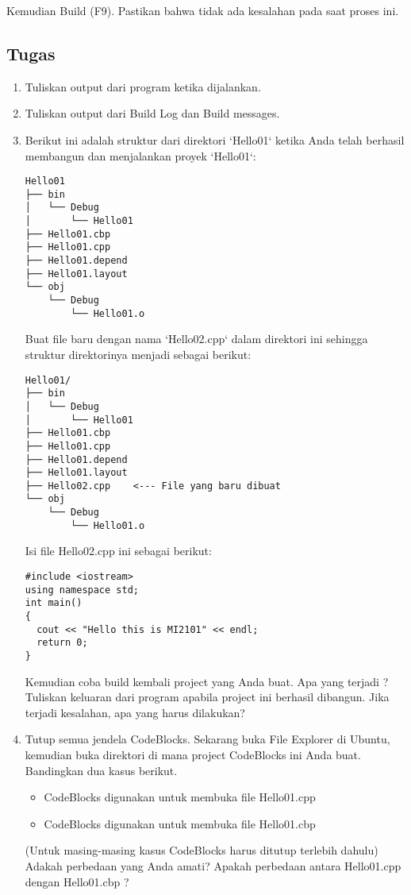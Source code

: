 \documentclass[a4paper,11pt]{extarticle}
\begin{document}
Kemudian \textsf{Build (F9)}. Pastikan bahwa tidak ada kesalahan pada saat proses ini.

\subsection{Tugas}

\begin{enumerate}
\item Tuliskan output dari program ketika dijalankan.
%
\item Tuliskan output dari \textsf{Build Log} dan \textsf{Build messages}.
%
\item Berikut ini adalah struktur dari direktori `Hello01` ketika Anda
      telah berhasil membangun dan menjalankan proyek `Hello01`:
%
\begin{verbatim}
Hello01
├── bin
│   └── Debug
│       └── Hello01
├── Hello01.cbp
├── Hello01.cpp
├── Hello01.depend
├── Hello01.layout
└── obj
    └── Debug
        └── Hello01.o
\end{verbatim}
   Buat file baru dengan nama `Hello02.cpp` dalam direktori ini sehingga
   struktur direktorinya menjadi sebagai berikut:
%
\begin{verbatim}
Hello01/
├── bin
│   └── Debug
│       └── Hello01
├── Hello01.cbp
├── Hello01.cpp
├── Hello01.depend
├── Hello01.layout
├── Hello02.cpp    <--- File yang baru dibuat
└── obj
    └── Debug
        └── Hello01.o
\end{verbatim}
%
  Isi file \textsf{Hello02.cpp} ini sebagai berikut:
%
\begin{verbatim}
#include <iostream>
using namespace std;
int main()
{
  cout << "Hello this is MI2101" << endl;
  return 0;
}
\end{verbatim}
%
   Kemudian coba build kembali project yang Anda buat. Apa yang terjadi ?
   Tuliskan keluaran dari program apabila project ini berhasil dibangun.
   Jika terjadi kesalahan, apa yang harus dilakukan?
%
\item Tutup semua jendela CodeBlocks.
      Sekarang buka File Explorer di Ubuntu, kemudian buka direktori di mana
      project CodeBlocks ini Anda buat.
      Bandingkan dua kasus berikut.
      \begin{itemize}  
      \item CodeBlocks digunakan untuk membuka file \textsf{Hello01.cpp}
      \item CodeBlocks digunakan untuk membuka file \textsf{Hello01.cbp}
      \end{itemize}
      (Untuk masing-masing kasus CodeBlocks harus ditutup terlebih dahulu)
      Adakah perbedaan yang Anda amati? Apakah perbedaan antara \textsf{Hello01.cpp}
      dengan \textsf{Hello01.cbp} ?

\end{enumerate}
\end{document}
